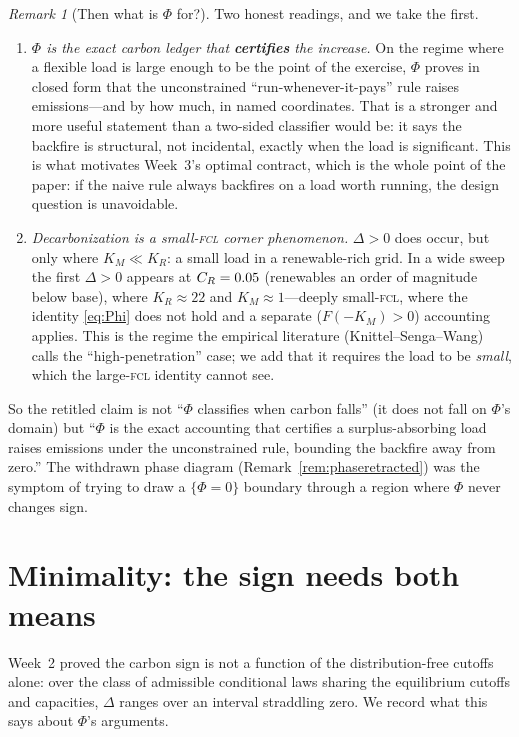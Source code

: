 \documentclass[11pt,reqno]{amsart}
\theoremstyle{plain}
\theoremstyle{definition}
\theoremstyle{remark}
\newtheorem{remark}{Remark}
\theoremstyle{remark}\newtheorem{observation}{Observation}
\newcommand{\KR}{K_R}\newcommand{\KF}{K_F}\newcommand{\KM}{K_M}
\begin{document}
\begin{remark}[Then what is $\Phi$ for?]\label{rem:whatphifor}
Two honest readings, and we take the first.
\begin{enumerate}
\item \emph{$\Phi$ is the exact carbon ledger that \textbf{certifies} the increase.} On the
regime where a flexible load is large enough to be the point of the exercise, $\Phi$ proves
in closed form that the unconstrained ``run-whenever-it-pays'' rule raises emissions---and by
how much, in named coordinates. That is a stronger and more useful statement than a two-sided
classifier would be: it says the backfire is structural, not incidental, exactly when the
load is significant. This is what motivates Week~3's optimal contract, which is the whole
point of the paper: if the naive rule always backfires on a load worth running, the design
question is unavoidable.
\item \emph{Decarbonization is a small-\textsc{fcl} corner phenomenon.} $\Delta>0$ does occur,
but only where $\KM\ll\KR$: a small load in a renewable-rich grid. In a wide sweep the first
$\Delta>0$ appears at $C_R=0.05$ (renewables an order of magnitude below base), where
$\KR\approx22$ and $\KM\approx1$---deeply small-\textsc{fcl}, where the identity
\eqref{eq:Phi} does not hold and a separate ($F(-\KM)>0$) accounting applies. This is the
regime the empirical literature (Knittel--Senga--Wang) calls the ``high-penetration'' case;
we add that it requires the load to be \emph{small}, which the large-\textsc{fcl} identity
cannot see.
\end{enumerate}
So the retitled claim is not ``$\Phi$ classifies when carbon falls'' (it does not fall on
$\Phi$'s domain) but ``$\Phi$ is the exact accounting that certifies a surplus-absorbing load
raises emissions under the unconstrained rule, bounding the backfire away from zero.'' The
withdrawn phase diagram (Remark~\ref{rem:phaseretracted}) was the symptom of trying to draw a
$\{\Phi=0\}$ boundary through a region where $\Phi$ never changes sign.
\end{remark}

\section{Minimality: the sign needs both means}\label{sec:minimal}

Week~2 proved the carbon sign is not a function of the distribution-free cutoffs
alone: over the class of admissible conditional laws sharing the equilibrium cutoffs and
capacities, $\Delta$ ranges over an interval straddling zero. We record what this says
about $\Phi$'s arguments.
\end{document}
